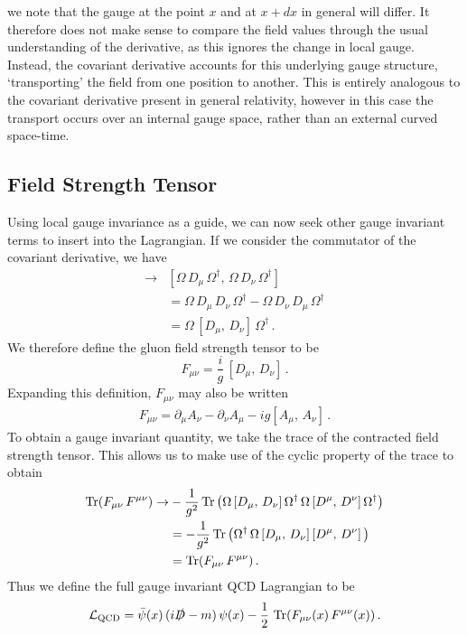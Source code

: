 %
we note that the gauge at the point $x$ and at $x+dx$ in general will differ. It therefore does not make sense to compare the field values through the usual understanding of the derivative, as this ignores the change in local gauge. Instead, the covariant derivative accounts for this underlying gauge structure, `transporting' the field from one position to another. This is entirely analogous to the covariant derivative present in general relativity, however in this case the transport occurs over an internal gauge space, rather than an external curved space-time.\\

\subsection{Field Strength Tensor}
Using local gauge invariance as a guide, we can now seek other gauge invariant terms to insert into the Lagrangian. If we consider the commutator of the covariant derivative, we have
%
\begin{align*}
[D_\mu,\, D_\nu]\rightarrow &[\Omega\,D_\mu\,\Omega^\dag,\,\Omega\,D_\nu\,\Omega^\dag]\\
&= \Omega\,D_\mu\, D_\nu\,\Omega^\dag - \Omega\,D_\nu\, D_\mu\,\Omega^\dag\\
&= \Omega\,[D_\mu,\,D_\nu]\,\Omega^\dag\, .
\end{align*}
%
We therefore define the gluon field strength tensor to be
%
\begin{equation}
F_{\mu\nu} = \frac{i}{g}\,[D_\mu,\, D_\nu]\, .
\end{equation}
%
Expanding this definition, $F_{\mu\nu}$ may also be written
%
\begin{align}
F_{\mu\nu}=\partial_\mu A_\nu - \partial_\nu A_\mu - ig[A_\mu,\,A_\nu]\, .
\label{eq:FieldStrengthTensor}
\end{align}
%
To obtain a gauge invariant quantity, we take the trace of the contracted field strength tensor. This allows us to make use of the cyclic property of the trace to obtain
%
\begin{align*}
\operatorname{Tr}(F_{\mu\nu}\,F^{\mu\nu})\rightarrow&-\frac{1}{g^2}\operatorname{Tr}\left(\Omega\,[D_\mu,\,D_\nu]\,\Omega^\dag\,\Omega\,[D^\mu,\,D^\nu]\,\Omega^\dag\right)\\
&=-\frac{1}{g^2}\operatorname{Tr}\left(\Omega^\dag\,\Omega\,[D_\mu,\,D_\nu]\,[D^\mu,\,D^\nu]\,\right)\\
&=\operatorname{Tr}(F_{\mu\nu}\,F^{\mu\nu})\, .
\end{align*}
%
Thus we define the full gauge invariant QCD Lagrangian to be
%
\begin{equation}
\mathcal{L_{\text{QCD}}}=\bar{\psi}(x)\,(i\slashed{D}-m)\,\psi(x)-\frac{1}{2}\,\operatorname{Tr}(F_{\mu\nu}(x)\,F^{\mu\nu}(x))\, .
\label{eq:QCDLagrangian}
\end{equation}\\

